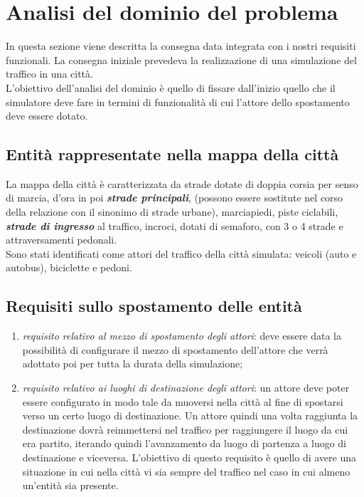 \section{Analisi del dominio del problema}
In questa sezione viene descritta la consegna data integrata con i nostri
requisiti funzionali. La consegna iniziale prevedeva la realizzazione di una
simulazione del traffico in una città. \\
L'obiettivo dell'analisi del dominio è quello di fissare dall'inizio quello che
il simulatore deve fare in termini di funzionalità di cui l'attore dello
spostamento deve essere dotato.

\subsection{Entità rappresentate nella mappa della città}
\label{firstmappa}
La mappa della città è caratterizzata da strade dotate di doppia corsia per
senso di marcia, d'ora in poi \textit{\textbf{strade principali}}, (possono
essere sostitute nel corso della relazione con il sinonimo di strade urbane),
marciapiedi, piste ciclabili, \textit{\textbf{strade di ingresso}} al traffico,
incroci, dotati di semaforo, con 3 o 4 strade e attraversamenti pedonali.\\
Sono stati identificati come attori del traffico della città simulata: veicoli
(auto e autobus), biciclette e pedoni.

\subsection{Requisiti sullo spostamento delle entità}
\begin{enumerate}
\item {\textit{requisito relativo al mezzo di spostamento degli attori}}: deve
essere data la possibilità di configurare il mezzo di spostamento dell'attore
che verrà adottato poi per tutta la durata della simulazione;
\item {\textit{requisito relativo ai luoghi di destinazione degli attori}}: un
attore deve poter essere configurato in modo tale da muoversi nella città al
fine di spostarsi verso un certo luogo di destinazione.
Un attore quindi una volta raggiunta la destinazione dovrà reimmettersi nel
traffico per raggiungere il luogo da cui era partito, iterando quindi
l'avanzamento da luogo di partenza a luogo di destinazione e viceversa.
L'obiettivo di questo requisito è quello di avere una situazione in cui nella
città vi sia sempre del traffico nel caso in cui almeno un'entità sia presente.
\end{enumerate}

